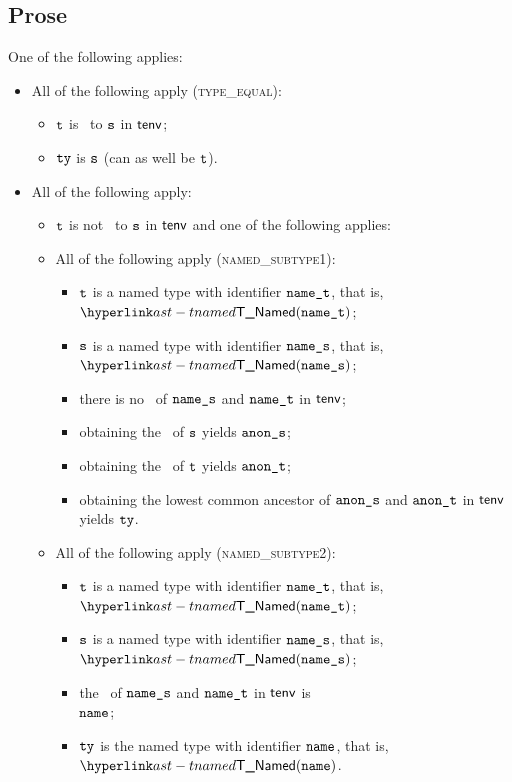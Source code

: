 \subsection{Prose}
One of the following applies:
\begin{itemize}
  \item All of the following apply (\textsc{type\_equal}):
  \begin{itemize}
    \item $\texttt{t}$ is \typeequal\ to $\texttt{s}$ in $\textsf{tenv}$;
    \item $\texttt{ty}$ is $\texttt{s}$ (can as well be $\texttt{t}$).
  \end{itemize}

  \item All of the following apply:
  \begin{itemize}
    \item $\texttt{t}$ is not \typeequal\ to $\texttt{s}$ in $\textsf{tenv}$ and one of the following applies:

    \item All of the following apply (\textsc{named\_subtype1}):
    \begin{itemize}
      \item $\texttt{t}$ is a named type with identifier $\texttt{name\_t}$, that is, $\TNamed(\namesubt)$;
      \item $\texttt{s}$ is a named type with identifier $\texttt{name\_s}$, that is, $\TNamed(\namesubs)$;
      \item there is no \namedlowestcommonancestor\ of $\texttt{name\_s}$ and $\texttt{name\_t}$ in $\textsf{tenv}$;
      \item obtaining the \underlyingtype\ of $\texttt{s}$ yields $\texttt{anon\_s}$\ProseOrTypeError;
      \item obtaining the \underlyingtype\ of $\texttt{t}$ yields $\texttt{anon\_t}$\ProseOrTypeError;
      \item obtaining the lowest common ancestor of $\texttt{anon\_s}$ and $\texttt{anon\_t}$ in $\textsf{tenv}$ yields $\texttt{ty}$\ProseOrTypeError.
    \end{itemize}

    \item All of the following apply (\textsc{named\_subtype2}):
    \begin{itemize}
      \item $\texttt{t}$ is a named type with identifier $\texttt{name\_t}$, that is, $\TNamed(\namesubt)$;
      \item $\texttt{s}$ is a named type with identifier $\texttt{name\_s}$, that is, $\TNamed(\namesubs)$;
      \item the \namedlowestcommonancestor\ of $\texttt{name\_s}$ and $\texttt{name\_t}$ in $\textsf{tenv}$ is \\
            $\texttt{name}$\ProseOrTypeError;
      \item $\texttt{ty}$ is the named type with identifier $\texttt{name}$, that is, $\TNamed(\name)$.
    \end{itemize}


\end{itemize}
\end{itemize}
